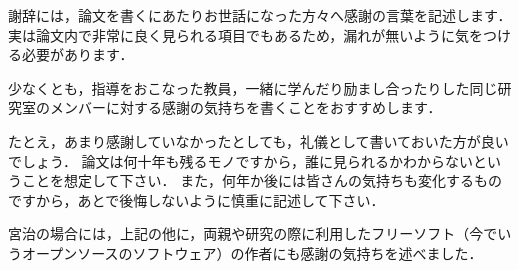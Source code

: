 謝辞には，論文を書くにあたりお世話になった方々へ感謝の言葉を記述します．
実は論文内で非常に良く見られる項目でもあるため，漏れが無いように気をつける必要があります．

少なくとも，指導をおこなった教員，一緒に学んだり励まし合ったりした同じ研究室のメンバーに対する感謝の気持ちを書くことをおすすめします．

たとえ，あまり感謝していなかったとしても，礼儀として書いておいた方が良いでしょう．
論文は何十年も残るモノですから，誰に見られるかわからないということを想定して下さい．
また，何年か後には皆さんの気持ちも変化するものですから，あとで後悔しないように慎重に記述して下さい．

宮治の場合には，上記の他に，両親や研究の際に利用したフリーソフト（今でいうオープンソースのソフトウェア）の作者にも感謝の気持ちを述べました．